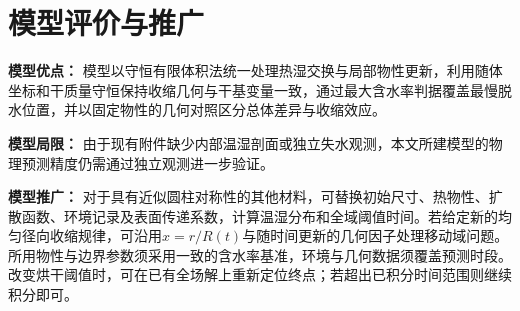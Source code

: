 \section{模型评价与推广}\label{sec:evaluation}
\noindent\textbf{模型优点：}
模型以守恒有限体积法统一处理热湿交换与局部物性更新，利用随体坐标和干质量守恒保持收缩几何与干基变量一致，通过最大含水率判据覆盖最慢脱水位置，并以固定物性的几何对照区分总体差异与收缩效应。

\noindent\textbf{模型局限：}
由于现有附件缺少内部温湿剖面或独立失水观测，本文所建模型的物理预测精度仍需通过独立观测进一步验证。

\noindent\textbf{模型推广：}
对于具有近似圆柱对称性的其他材料，可替换初始尺寸、热物性、扩散函数、环境记录及表面传递系数，计算温湿分布和全域阈值时间。若给定新的均匀径向收缩规律，可沿用$x=r/R(t)$与随时间更新的几何因子处理移动域问题。所用物性与边界参数须采用一致的含水率基准，环境与几何数据须覆盖预测时段。改变烘干阈值时，可在已有全场解上重新定位终点；若超出已积分时间范围则继续积分即可。
